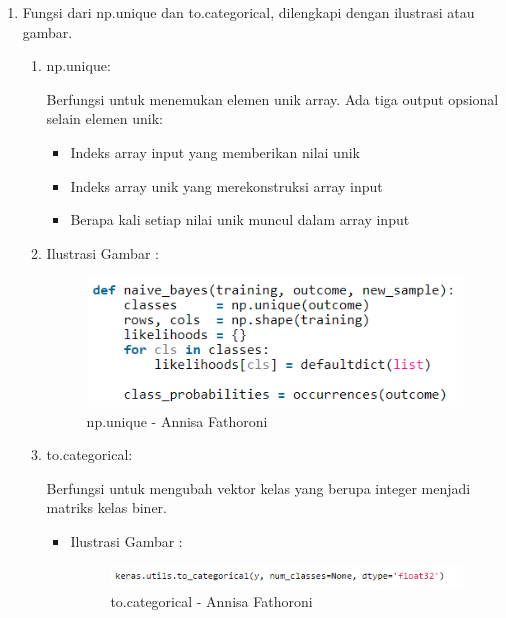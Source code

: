 \begin{enumerate}
\begin{itemize}
\end{itemize}

\item Fungsi dari np.unique dan to.categorical, dilengkapi dengan ilustrasi atau gambar.
\begin{enumerate}
\item np.unique:

Berfungsi untuk menemukan elemen unik array. Ada tiga output opsional selain elemen unik:

\begin{itemize}
\item Indeks array input yang memberikan nilai unik
\item Indeks array unik yang merekonstruksi array input
\item Berapa kali setiap nilai unik muncul dalam array input
\end{itemize}

\item Ilustrasi Gambar :

\begin{figure}[!hbtp]
\centering
\includegraphics[scale=0.7]{figures/Chapter6AnnisaFathoroni7-1.png}
\caption{np.unique - Annisa Fathoroni}
\label{np.unique - Annisa Fathoroni}
\end{figure}

\item to.categorical:

Berfungsi untuk mengubah vektor kelas yang berupa integer menjadi matriks kelas biner.

\begin{itemize}
\item Ilustrasi Gambar :

\begin{figure}[!hbtp]
\centering
\includegraphics[scale=0.7]{figures/Chapter6AnnisaFathoroni7-2.png}
\caption{to.categorical - Annisa Fathoroni}
\label{to.categorical - Annisa Fathoroni}
\end{figure}


\end{itemize}
\end{enumerate}
\end{enumerate}

